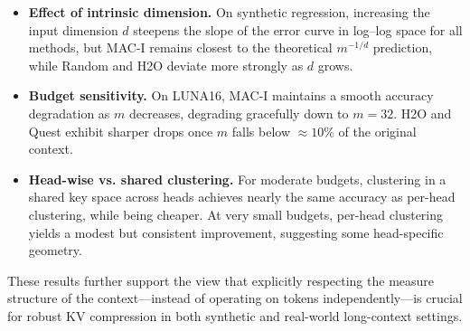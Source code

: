 \documentclass{article}
\theoremstyle{plain}
\theoremstyle{definition}
\theoremstyle{remark}
\begin{document}
\begin{itemize}[leftmargin=*,noitemsep,topsep=1pt]
    \item \textbf{Effect of intrinsic dimension.} On synthetic regression, increasing the
    input dimension $d$ steepens the slope of the error curve in log--log space for all
    methods, but MAC-I remains closest to the theoretical $m^{-1/d}$ prediction, while
    Random and H2O deviate more strongly as $d$ grows.
    \item \textbf{Budget sensitivity.} On LUNA16, MAC-I maintains a smooth accuracy
    degradation as $m$ decreases, degrading gracefully down to $m=32$. H2O and Quest
    exhibit sharper drops once $m$ falls below $\approx 10\%$ of the original context.
    \item \textbf{Head-wise vs. shared clustering.} For moderate budgets, clustering in a
    shared key space across heads achieves nearly the same accuracy as per-head
    clustering, while being cheaper. At very small budgets, per-head clustering yields a
    modest but consistent improvement, suggesting some head-specific geometry.
\end{itemize}

These results further support the view that explicitly respecting the measure structure
of the context---instead of operating on tokens independently---is crucial for robust KV
compression in both synthetic and real-world long-context settings.
\end{document}
